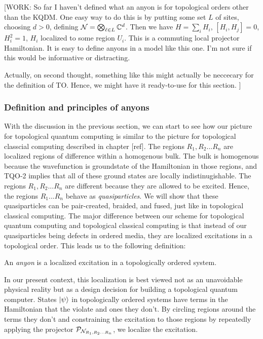 [WORK: So far I haven't defined what an anyon is for topological orders other than the KQDM. One easy way to do this is by putting some set $L$ of sites, choosing $d>0$, defining $\mathcal{N}=\bigotimes_{\ell \in L}\mathbb{C}^d$. Then we have $H=\sum_{i}H_i$, $[H_i,H_j]=0$, $H_i^2=1$, $H_i$ localized to some region $U_i$. This is a commuting local projector Hamiltonian. It is easy to define anyons in a model like this one. I'm not sure if this would be informative or distracting.

Actually, on second thought, something like this might actually be neccecary for the definition of TO. Hence, we might have it ready-to-use for this section.
]


\subsubsection{Definition and principles of anyons}

With the discussion in the previous section, we can start to see how our picture for topological quantum computing is similar to the picture for topological classcial computing described in chapter [ref]. The regions $R_1,R_2... R_n$ are localized regions of difference within a homogenous bulk. The bulk is homogenous because the wavefunction is groundstate of the Hamiltonian in those regions, and TQO-2 implies that all of these ground states are locally indistinugishable. The regions $R_1,R_2... R_n$ are different because they are allowed to be excited. Hence, the regions $R_1... R_n$ behave as \textit{quasiparticles}. We will show that these quasiparticles can be pair-created, braided, and fused, just like in topological classical computing. The major difference between our scheme for topological quantum computing and topological classical computing is that instead of our quasiparticles being defects in ordered media, they are localized excitations in a topological order. This leads us to the following definition:

\begin{definition} An \textit{anyon} is a localized excitation in a topologically ordered system.
\end{definition}

In our present context, this localization is best viewed not as an unavoidable physical reality but as a design decision for building a topological quantum computer. States $\ket{\psi}$ in topologically ordered systems have terms in the Hamiltonian that the violate and ones they don't. By circling regions around the terms they don't and constraining the excitation to those regions by repeatedly applying the projector $\mathcal{P}_{\mathcal{N}_{R_1,R_2... R_n}}$, we localize the excitation.

